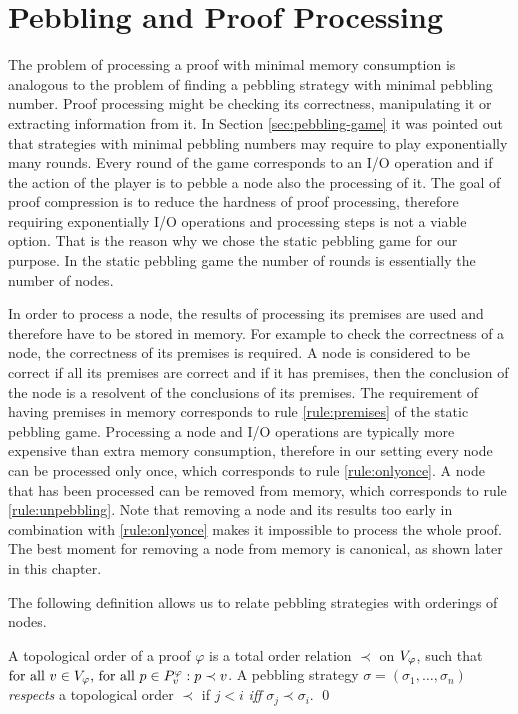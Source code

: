 \section{Pebbling and Proof Processing}
\label{sec:pebblingchecking}

The problem of processing a proof with minimal memory consumption is analogous to the problem of finding a pebbling strategy with minimal pebbling number.
Proof processing might be checking its correctness, manipulating it or extracting information from it.
In Section \ref{sec:pebbling-game} it was pointed out that strategies with minimal pebbling numbers may require to play exponentially many rounds.
Every round of the game corresponds to an I/O operation and if the action of the player is to pebble a node also the processing of it.
The goal of proof compression is to reduce the hardness of proof processing, therefore requiring exponentially I/O operations and processing steps is not a viable option.
That is the reason why we chose the static pebbling game for our purpose.
In the static pebbling game the number of rounds is essentially the number of nodes.

In order to process a node, the results of processing its premises are used and therefore have to be stored in memory.
For example to check the correctness of a node, the correctness of its premises is required.
A node is considered to be correct if all its premises are correct and if it has premises, then the conclusion of the node is a resolvent of the conclusions of its premises.
The requirement of having premises in memory corresponds to rule \ref{rule:premises} of the static pebbling game. 
Processing a node and I/O operations are typically more expensive than extra memory consumption, therefore in our setting every node can be processed only once, which corresponds to rule \ref{rule:onlyonce}.
A node that has been processed can be removed from memory, which corresponds to rule \ref{rule:unpebbling}.
Note that removing a node and its results too early in combination with \ref{rule:onlyonce} makes it impossible to process the whole proof.
The best moment for removing a node from memory is canonical, as shown later in this chapter.


The following definition allows us to relate pebbling strategies with orderings of nodes.

\begin{definition}
\label{def:topological-order}
A topological order of a proof $\varphi$ is a total order relation $\prec$ on $V_{\varphi}$, such that 
$\text{for all } v \in V_{\varphi} \text{, for all } p \in P_{v}^{\varphi}:
p \prec v$.
A pebbling strategy $\sigma = (\sigma_1,\ldots,\sigma_n)$ \emph{respects} a topological order $\prec$ if $j < i$ \emph{iff} $\sigma_j \prec \sigma_i$.
\qed
\end{definition}

